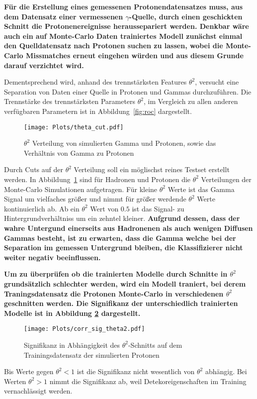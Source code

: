 \textbf{Für die Erstellung eines gemessenen Protonendatensatzes muss, aus dem Datensatz einer vermessenen $\gamma$-Quelle, durch einen geschickten Schnitt die Protonenereignisse heraussepariert werden. 
Denkbar wäre auch ein auf Monte-Carlo Daten trainiertes Modell zunächst einmal den Quelldatensatz nach Protonen suchen zu lassen, wobei die Monte-Carlo Missmatches erneut eingehen würden und aus diesem Grunde darauf verzichtet wird.}

Dementsprechend wird, anhand des trennstärksten Features $\theta^{2}$, versucht eine Separation von Daten einer Quelle in Protonen und Gammas durchzuführen. 
Die Trennstärke des trennstärksten Parameters $\theta^{2}$, im Vergleich zu allen anderen verfügbaren Parametern ist in Abbildung~\ref{fig:roc} dargestellt. 
\begin{figure}[H]
  \centering
  \texttt{[image: Plots/theta\_cut.pdf]}
  \caption{$\theta^{2}$ Verteilung von simulierten Gamma und Protonen, sowie das Verhältnis von Gamma zu Protonen}
  \label{fig:thetacut}
\end{figure}
Durch Cuts auf der $\theta^{2}$ Verteilung soll ein möglischst reines Testset erstellt werden. 
In Abbildung~\ref{fig:thetacut} sind für Hadronen und Protonen die $\theta^{2}$ Verteilungen der Monte-Carlo Simulationen aufgetragen. 
Für kleine $\theta^{2}$ Werte ist das Gamma Signal um vielfaches größer und nimmt für größer werdende $\theta^{2}$ Werte kontinuierlich ab. 
Ab ein $\theta^{2}$ Wert von $0.5$ ist das Signal- zu Hintergrundverhältniss um ein zehntel kleiner.
\textbf{Aufgrund dessen, dass der wahre Untergund einerseits aus Hadronenen als auch wenigen Diffusen Gammas besteht, ist zu erwarten, dass die Gamma welche bei der Separation im gemessen Untergrund bleiben, die Klassifizierer nicht weiter negativ beeinflussen.}

\textbf{Um zu überprüfen ob die trainierten Modelle durch Schnitte in $\theta^{2}$ grundsätzlich schlechter werden, wird ein Modell traniert, bei derem Traningsdatensatz die Protonen Monte-Carlo in verschiedenen $\theta^{2}$ geschnitten werden. 
Die Signifikanz der unterschiedlich trainierten Modelle ist in Abbildung \ref{fig:corrtheta} dargestellt.}
\begin{figure}[H]
  \centering
  \texttt{[image: Plots/corr\_sig\_theta2.pdf]}
  \caption{Signifikanz in Abhängigkeit des $\theta^{2}$-Schnitts auf dem Trainingsdatensatz der simulierten Protonen}
  \label{fig:corrtheta}
\end{figure}
Bis Werte gegen $\theta^{2} < 1$ ist die Signifikanz nicht wesentlich von $\theta^{2}$ abhängig. 
Bei Werten $\theta^{2} > 1$ nimmt die Signifikanz ab, weil Detekoreigenschaften im Training vernachlässigt werden.

